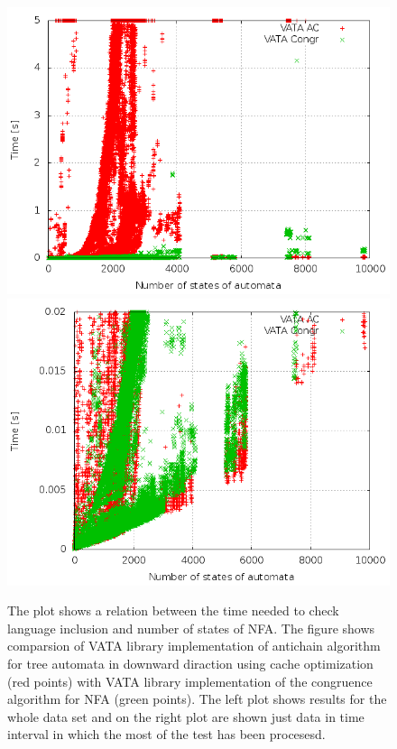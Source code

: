 \begin{figure}
\begin{center}
\includegraphics[scale=0.3]{fig/plot_ca_zprava.png}
\includegraphics[scale=0.3]{fig/plot_ca_step_zprava.png}
\label{figPlotCa}
\caption{The plot shows a relation between the time needed to check language inclusion and number of states of NFA. The figure shows
 comparsion of VATA library implementation of antichain algorithm for tree automata in downward diraction using cache optimization (red points) 
   with VATA library implementation of the congruence algorithm for NFA (green points). 
   The left plot shows results for the whole data set and on the right plot are shown just data in time interval in which the most 
   of the test has been procesesd.}
\end{center}
\end{figure}

